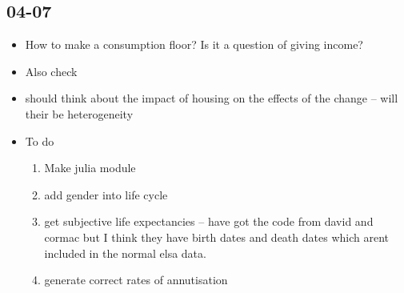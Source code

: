 \documentclass[12pt]{article}
\begin{document}
\subsection{\textbf{04-07}}
\begin{itemize}
    \item How to make a consumption floor? Is it a question of giving income?
    \item Also check
    \item should think about the impact of housing on the effects of the change
          -- will their be heterogeneity

    \item To do
          \begin{enumerate}
              \item Make julia module
              \item add gender into life cycle
              \item get subjective life expectancies -- have got the code from
                    david and cormac but I think they have birth dates and death dates which
                    arent included in the normal elsa data.
              \item generate correct rates of annutisation
          \end{enumerate}
\end{itemize}
\end{document}
